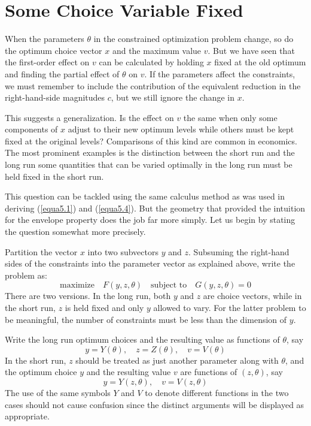 \section*{Some Choice Variable Fixed}

When the parameters $\theta$ in the constrained optimization problem change, so do the optimum choice vector $x$ and the maximum value $v$. But we have seen that the first-order effect on $v$ can be calculated by holding $x$ fixed at the old optimum and finding the partial effect of $\theta$ on $v$. If the parameters affect the constraints, we must remember to include the contribution of the equivalent reduction in the right-hand-side magnitudes $c$, but we still ignore the change in $x$.

This suggests a generalization. Is the effect on $v$ the same when only some components of $x$ adjust to their new optimum levels while others must be kept fixed at the original levels? Comparisons of this kind are common in economics. The most prominent examples is the distinction between the short run and the long run some quantities that can be varied optimally in the long run must be held fixed in the short run.

This question can be tackled using the same calculus method as was used in deriving (\ref{equa5.1}) and (\ref{equa5.4}). But the geometry that provided the intuition for the envelope property does the job far more simply. Let us begin by stating the question somewhat more precisely.

Partition the vector $x$ into two subvectors $y$ and $z$. Subsuming the right-hand sides of the constraints into the parameter vector as explained above, write the problem as:
\begin{equation} \label{equa5.5}
  \mbox{maximize} \quad F(y,z,\theta) \quad \mbox{subject to} \quad G(y,z,\theta)=0
\end{equation}
There are two versions. In the long run, both $y$ and $z$ are choice vectors, while in the short run, $z$ is held fixed and only $y$ allowed to vary. For the latter problem to be meaningful, the number of constraints must be less than the dimension of $y$.

Write the long run optimum choices and the resulting value as functions of $\theta$, say
\begin{equation} \label{equa5.6}
  y=Y(\theta), \quad z=Z(\theta), \quad v=V(\theta)
\end{equation}
In the short run, $z$ should be treated as just another parameter along with $\theta$, and the optimum choice $y$ and the resulting value $v$ are functions of $(z,\theta)$, say
\begin{equation} \label{equa5.7}
  y = Y(z,\theta), \quad v=V(z,\theta)
\end{equation}
The use of the same symbols $Y$ and $V$ to denote different functions in the two cases should not cause confusion since the distinct arguments will be displayed as appropriate.

